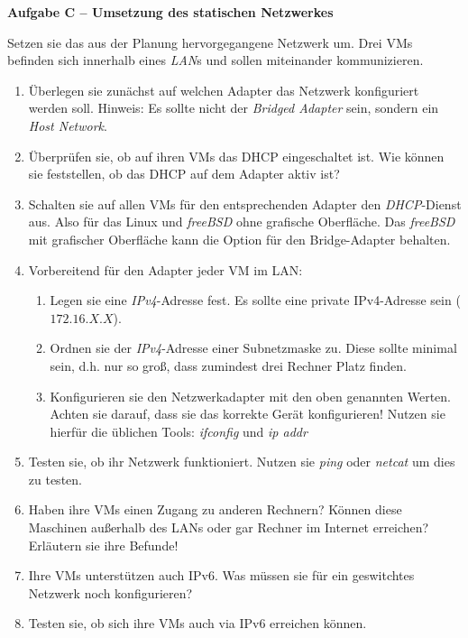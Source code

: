 \documentclass[paper=a4,fontsize=11pt]{scrartcl}%
\begin{document}
\begin{center}\Large{\textbf{Aufgabe C -- Umsetzung des statischen Netzwerkes}}\end{center}\vskip0.25in
Setzen sie das aus der Planung hervorgegangene Netzwerk um. Drei VMs befinden sich innerhalb eines \emph{LAN}s und sollen miteinander kommunizieren.
\begin{enumerate}
	\item Überlegen sie zunächst auf welchen Adapter das Netzwerk konfiguriert werden soll. Hinweis: Es sollte nicht der \emph{Bridged Adapter} sein, sondern ein \emph{Host Network}.
	\item Überprüfen sie, ob auf ihren VMs das DHCP eingeschaltet ist. Wie können sie feststellen, ob das DHCP auf dem Adapter aktiv ist?
	\item Schalten sie auf allen VMs für den entsprechenden Adapter den \emph{DHCP}-Dienst aus. Also für das Linux und \emph{freeBSD} ohne grafische Oberfläche. Das \emph{freeBSD} mit grafischer Oberfläche kann die Option für den Bridge-Adapter behalten.
	\item Vorbereitend für den Adapter jeder VM im LAN:
	\begin{enumerate}
		\item Legen sie eine \emph{IPv4}-Adresse fest. Es sollte eine private IPv4-Adresse sein ($172.16.X.X$).
		\item Ordnen sie der  \emph{IPv4}-Adresse einer Subnetzmaske zu. Diese sollte minimal sein, d.h. nur so groß, dass zumindest drei Rechner Platz finden.
		\item Konfigurieren sie den Netzwerkadapter mit den oben genannten Werten. Achten sie darauf, dass sie das korrekte Gerät konfigurieren! Nutzen sie hierfür die üblichen Tools: \emph{ifconfig} und \emph{ip addr}
	\end{enumerate}
	\item Testen sie, ob ihr Netzwerk funktioniert. Nutzen sie \emph{ping} oder \emph{netcat} um dies zu testen.
	\item Haben ihre VMs einen Zugang zu anderen Rechnern? Können diese Maschinen außerhalb des LANs oder gar Rechner im Internet erreichen? Erläutern sie ihre Befunde!
	\item Ihre VMs unterstützen auch IPv6. Was müssen sie für ein geswitchtes Netzwerk noch konfigurieren?
	\item Testen sie, ob sich ihre VMs auch via IPv6 erreichen können.
\end{enumerate}
\end{document}
